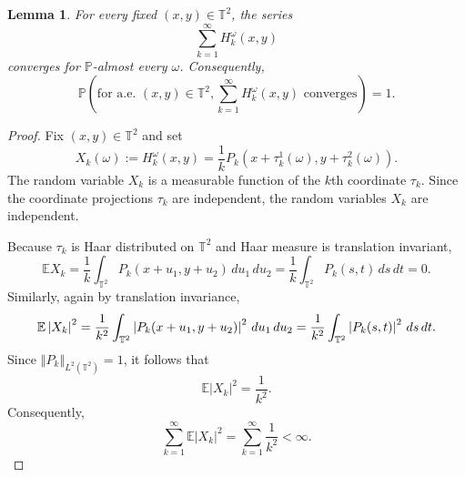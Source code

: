\documentclass[11pt]{amsart}
\numberwithin{equation}{section}
\newtheorem{lemma}[theorem]{Lemma}
\begin{document}
\begin{lemma}
\label{lem:pointwise-random-conv} For every fixed $(x,y)\in\mathbb{T}^2$,
the series 
\begin{equation*}
\sum_{k=1}^{\infty}H_k^\omega(x,y)
\end{equation*}
converges for $\mathbb{P}$-almost every $\omega$. Consequently, 
\begin{equation*}
\mathbb{P}\left( \text{for a.e. }(x,y)\in\mathbb{T}^2,
\sum_{k=1}^{\infty}H_k^\omega(x,y)\text{ converges} \right)=1.
\end{equation*}
\end{lemma}

\begin{proof}
Fix $(x,y)\in\mathbb{T}^2$ and set 
\begin{equation*}
X_k(\omega):=H_k^\omega(x,y) =\frac1k
P_k(x+\tau_k^1(\omega),y+\tau_k^2(\omega)).
\end{equation*}
The random variable $X_k$ is a measurable function of the $k$th coordinate $%
\tau_k$. Since the coordinate projections $\tau_k$ are independent, the
random variables $X_k$ are independent.

Because $\tau _{k}$ is Haar distributed on $\mathbb{T}^{2}$ and Haar measure
is translation invariant, 
\begin{equation*}
\mathbb{E}X_{k}=\frac{1}{k}\int_{\mathbb{T}^{2}}P_{k}(x+u_{1},y+u_{2})%
\,du_{1}\,du_{2}=\frac{1}{k}\int_{\mathbb{T}^{2}}P_{k}(s,t)\,ds\,dt=0.
\end{equation*}%
Similarly, again by translation invariance, 
\begin{equation*}
\mathbb{E}\left\vert X_{k}\right\vert ^{2}=\frac{1}{k^{2}}\int_{\mathbb{T}%
^{2}}\left\vert P_{k}(x+u_{1},y+u_{2})\right\vert ^{2}\,du_{1}\,du_{2}=\frac{%
1}{k^{2}}\int_{\mathbb{T}^{2}}\left\vert P_{k}(s,t)\right\vert ^{2}\,ds\,dt.
\end{equation*}%
Since $\left\Vert P_{k}\right\Vert _{L^{2}(\mathbb{T}^{2})}=1$, it follows
that 
\begin{equation*}
\mathbb{E}\left\vert X_{k}\right\vert ^{2}=\frac{1}{k^{2}}.
\end{equation*}%
Consequently, 
\begin{equation*}
\sum_{k=1}^{\infty }\mathbb{E}\left\vert X_{k}\right\vert
^{2}=\sum_{k=1}^{\infty }\frac{1}{k^{2}}<\infty .
\end{equation*}


\end{proof}
\end{document}
